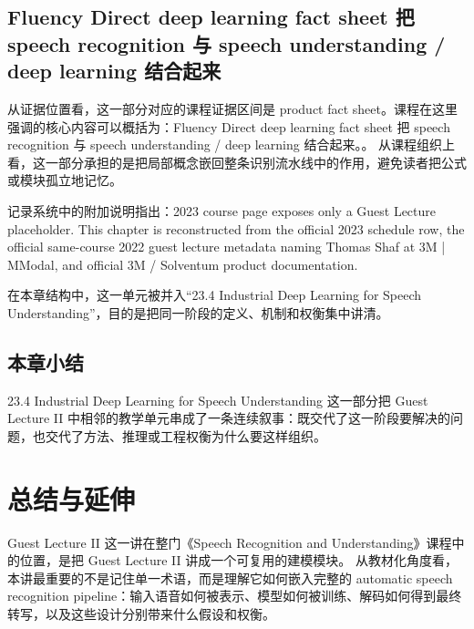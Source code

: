 \documentclass[a4paper]{article}
\begin{document}
\subsection{Fluency Direct deep learning fact sheet 把 speech recognition 与 speech understanding / deep learning 结合起来}
从证据位置看，这一部分对应的课程证据区间是 product fact sheet。课程在这里强调的核心内容可以概括为：Fluency Direct deep learning fact sheet 把 speech recognition 与 speech understanding / deep learning 结合起来。。
从课程组织上看，这一部分承担的是把局部概念嵌回整条识别流水线中的作用，避免读者把公式或模块孤立地记忆。

记录系统中的附加说明指出：2023 course page exposes only a Guest Lecture placeholder. This chapter is reconstructed from the official 2023 schedule row, the official same-course 2022 guest lecture metadata naming Thomas Shaf at 3M | MModal, and official 3M / Solventum product documentation.

在本章结构中，这一单元被并入“23.4 Industrial Deep Learning for Speech Understanding”，目的是把同一阶段的定义、机制和权衡集中讲清。

\subsection{本章小结}
23.4 Industrial Deep Learning for Speech Understanding 这一部分把 Guest Lecture II 中相邻的教学单元串成了一条连续叙事：既交代了这一阶段要解决的问题，也交代了方法、推理或工程权衡为什么要这样组织。

\section{总结与延伸}
Guest Lecture II 这一讲在整门《Speech Recognition and Understanding》课程中的位置，是把 Guest Lecture II 讲成一个可复用的建模模块。
从教材化角度看，本讲最重要的不是记住单一术语，而是理解它如何嵌入完整的 automatic speech recognition pipeline：输入语音如何被表示、模型如何被训练、解码如何得到最终转写，以及这些设计分别带来什么假设和权衡。
\end{document}
